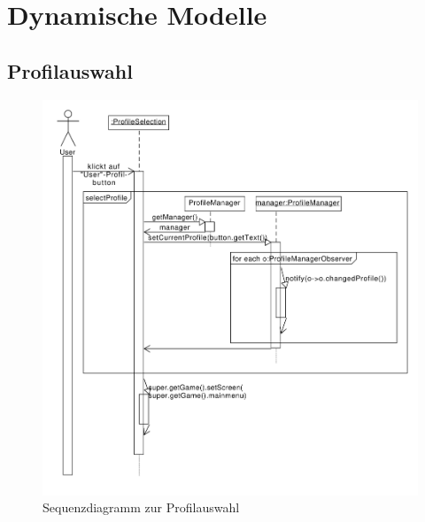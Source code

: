 \section{Dynamische Modelle}

\subsection{Profilauswahl}
\begin{figure}[H]
\centering
\includegraphics[scale=0.65]{../sequence_diagrams/profile_scenarios/Profilauswahl.pdf}
\caption{Sequenzdiagramm zur Profilauswahl}
\end{figure}

